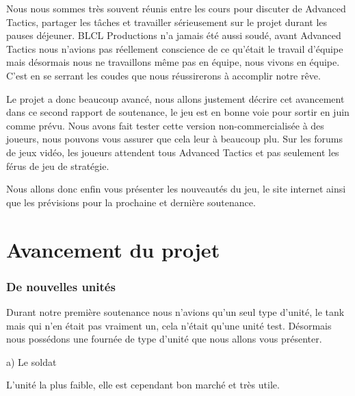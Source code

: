 \documentclass{article}
\begin{document}
\par
Nous nous sommes très souvent réunis entre les cours pour discuter de Advanced Tactics, partager les tâches et travailler sérieusement sur le projet durant les pauses déjeuner. BLCL Productions n'a jamais été aussi soudé, avant Advanced Tactics nous n'avions pas réellement conscience de ce qu'était le travail d'équipe
mais désormais nous ne travaillons même pas en équipe, nous vivons en équipe. C'est en se serrant les coudes que nous réussirerons à accomplir notre rêve.
\newline

\par
Le projet a donc beaucoup avancé, nous allons justement décrire cet avancement dans ce second rapport de soutenance, le jeu est en bonne voie pour sortir en juin comme prévu. Nous avons fait tester cette version non-commercialisée à des joueurs, nous pouvons vous assurer que cela leur à beaucoup plu. Sur les forums
de jeux vidéo, les joueurs attendent tous Advanced Tactics et pas seulement les férus de jeu de stratégie.
\newline

\par
Nous allons donc enfin vous présenter les nouveautés du jeu, le site internet ainsi que les prévisions pour la prochaine et dernière soutenance.

\newpage



\section{Avancement du projet}

\subsubsection{De nouvelles unités}

\par
Durant notre première soutenance nous n'avions qu'un seul type d'unité, le tank mais qui n'en était pas vraiment un, cela n'était qu'une unité test. Désormais nous possédons une fournée de type d'unité que nous allons vous présenter.
\newline

\par
a)                 Le soldat
\newline

\par
L'unité la plus faible, elle est cependant bon marché et très utile.
\newline
\end{document}
